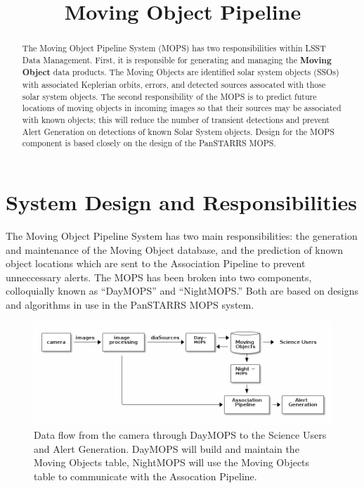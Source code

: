 \documentclass[12pt,preprint]{aastex}
\begin{document}
\title{Moving Object Pipeline}

\author{}

\begin{abstract}

The Moving Object Pipeline System (MOPS) has two responsibilities
within LSST Data Management.  First, it is responsible for generating
and managing the \textbf{Moving Object} data products.  The Moving
Objects are identified solar system objects (SSOs) with associated
Keplerian orbits, errors, and detected sources assocated with those
solar system objects.  The second responsibility of the MOPS is to
predict future locations of moving objects in incoming images so that
their sources may be associated with known objects; this will reduce
the number of transient detections and prevent Alert Generation on
detections of known Solar System objects.  Design for the MOPS
component is based closely on the design of the PanSTARRS MOPS.

\end{abstract}

\tableofcontents


\section{System Design and Responsibilities}

The Moving Object Pipeline System has two main responsibilities: the
generation and maintenance of the Moving Object database, and the
prediction of known object locations which are sent to the Association
Pipeline to prevent unneccessary alerts.  The MOPS has been broken
into two components, colloquially known as ``DayMOPS'' and ``NightMOPS.''
Both are based on designs and algorithms in use in the PanSTARRS MOPS
system.
 

\begin{figure}[!ht]
\begin{center}
  \includegraphics[width=13cm]{illustrations/mopsWithinLsst.png}
\end{center}
\caption{ Data flow from the camera through DayMOPS to the Science
  Users and Alert Generation.  DayMOPS will build and maintain the
  Moving Objects table, NightMOPS will use the Moving Objects table to
  communicate with the Assocation Pipeline.  }
\label{mopsWithinLsst}
\end{figure}
\end{document}

